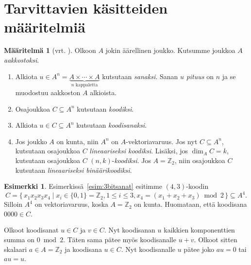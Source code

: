 \documentclass[a4paper,12pt,leqno,oneside]{report} %
\theoremstyle{plain}
\newtheorem{lause}{Lause}[chapter]
\theoremstyle{plain}
\theoremstyle{definition}
\newtheorem{maaritelma}{Määritelmä}[chapter]
\newtheorem{esimerkki}{Esimerkki}[chapter]
\theoremstyle{remark}
\numberwithin{equation}{chapter}
\newcommand*{\Zset}{\mathbb{Z}}  %
\begin{document}
    \section{Tarvittavien käsitteiden määritelmiä}
    \begin{maaritelma}[vrt. {\cite[s.~491]{PA}}]\label{maar:tarvittavat}
        Olkoon $A$ jokin äärellinen joukko. Kutsumme joukkoa $A$ \emph{aakkostoksi}.

        \begin{enumerate}
            \item Alkiota $u \in  A^n = \underbrace{A \times \cdots \times A}_{
                \text{$n$ kappaletta}}$ kutsutaan \emph{sanaksi}. Sanan $u$ \emph{pituus} on $n$ ja se muodostuu aakkoston $A$ alkioista.
            \item Osajoukkoa $C \subseteq A^n$ kutsutaan \emph{koodiksi}.
            \item Alkiota $u \in C \subseteq A^n$ kutsutaan \emph{koodisanaksi}.
            \item\label{kht:linkoodi} Jos joukko $A$ on kunta, niin $A^n$ on $A$-vektoriavaruus. Jos nyt $C \subseteq A^n$, kutsutaan osajoukkoa $C$ \emph{lineaariseksi koodiksi}. Lisäksi, jos $\dim_A C = k$, kutsutaan osajoukkoa $C$ $(n, k)$-\emph{koodiksi}. Jos $A = \Zset_2$, niin osajoukkoa $C$ kutsutaan \emph{lineaariseksi binäärikoodiksi}.
        \end{enumerate}
    \end{maaritelma}

    \begin{esimerkki}\label{esim:todaliav}
        Esimerkissä~\ref{esim:3bitsanat} esitimme $(4,3)$-koodin
        \[
            C = \{\, x_1x_2x_3x_4 \mid  x_i \in \{0,1\} = \Zset_2, 1 \le i \le 3, x_4 = (x_1 + x_2 + x_3) \bmod2\,\} \subseteq A^4.
        \]
        Silloin $A^4$ on vektoriavaruus, koska $A = \Zset_2$ on kunta. Huomataan, että koodisana $0000 \in C$. 

        Olkoot koodisanat $u \in C$ ja $v \in C$. Nyt koodisanan $u$ kaikkien komponenttien summa on $0 \bmod2$. Täten sama pätee myös koodisanalle $u + v$. Olkoot sitten skalaari $a \in A = \Zset_2$ ja koodisana $u \in C$. Nyt koodisanalle $u$ pätee joko $au = 0$ tai $au = u$.
    \end{esimerkki}

\end{document}
